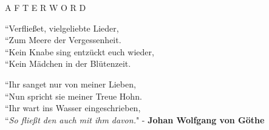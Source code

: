 \documentclass[12pt]{article}
\begin{document}
\begingroup
\begin{center}
\end{center}
\endgroup

\vspace{8\baselineskip}

\begingroup
\begin{center}
\huge A F T E R W O R D
\end{center}
\endgroup

\vspace{3\baselineskip}

\begingroup
``Verfließet, vielgeliebte Lieder,\\
``Zum Meere der Vergessenheit.\\
``Kein Knabe sing entzückt euch wieder,\\
``Kein Mädchen in der Blütenzeit.\\
\endgroup

\begingroup
``Ihr sanget nur von meiner Lieben,\\
``Nun spricht sie meiner Treue Hohn.\\
``Ihr wart ins Wasser eingeschrieben,\\
``\textit{So fließt den auch mit ihm davon.}"
\phantom{text} \hfill - \textbf{Johan Wolfgang von Göthe}\\
\endgroup
\end{document}
